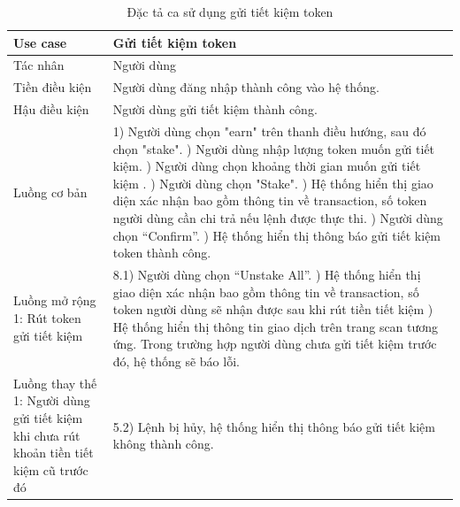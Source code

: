 \begin{table}[H]
    \centering
    \begin{tabular}{|p{5cm}|p{8cm}|}
        \hline
        Use case                                 & Gửi tiết kiệm token                                               \\
        \hline
        Tác nhân                                 & Người dùng                                                        \\
        \hline
        Tiền điều kiện                           & Người dùng đăng nhập thành công vào hệ thống.                     \\
        \hline
        Hậu điều kiện                            & Người dùng gửi tiết kiệm thành công.                              \\
        \hline
        Luồng cơ bản                             & 1) Người dùng chọn "earn" trên thanh điều hướng, sau đó
        chọn "stake". \newline
        2) Người dùng nhập lượng token muốn gửi tiết kiệm. \newline
        3) Người dùng chọn khoảng thời gian muốn gửi tiết kiệm . \newline
        4) Người dùng chọn "Stake". \newline
        5) Hệ thống hiển thị giao diện xác nhận bao gồm thông tin về transaction, số
        token người dùng cần chi trả nếu lệnh được thực thi. \newline
        6) Người dùng chọn ``Confirm''. \newline
        7) Hệ thống hiển thị thông báo gửi tiết kiệm token thành công.                                               \\
        \hline
        Luồng mở rộng 1: Rút token gửi tiết kiệm & 8.1) Người dùng chọn ``Unstake
        All''. \newline
        9.1) Hệ thống hiển thị giao diện xác nhận bao gồm thông tin về transaction, số
        token người dùng sẽ nhận được sau khi rút tiền tiết kiệm \newline
        10.1) Hệ thống hiển thị thông tin giao dịch trên trang scan tương ứng. Trong
        trường hợp người dùng chưa gửi tiết kiệm trước đó, hệ thống sẽ báo lỗi.                                      \\
        \hline
        Luồng thay thế 1: Người dùng gửi tiết kiệm khi chưa rút khoản tiền tiết kiệm cũ
        trước đó                                 & 5.2) Lệnh bị hủy, hệ thống hiển thị thông báo gửi tiết kiệm không
        thành công.                                                                                                  \\
        \hline
    \end{tabular}
    \caption{Đặc tả ca sử dụng gửi tiết kiệm token}
    \label{tab:auto-order-token}
\end{table}

